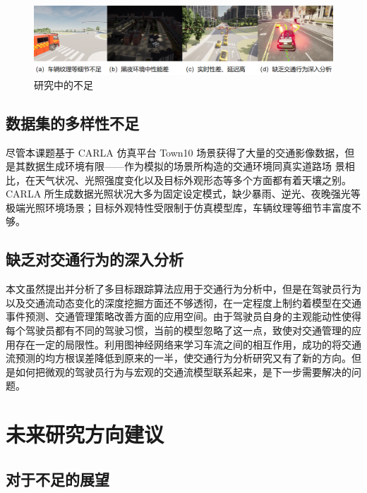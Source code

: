 \begin{figure}[htbp] %
	\centering
	\includegraphics[width=1\textwidth]{p46} %
	\caption{研究中的不足} %
	\label{fig:p46} %
\end{figure}


\subsection{数据集的多样性不足}

尽管本课题基于 CARLA 仿真平台 Town10 场景获得了大量的交通影像数据，但是其数据生成环境有限——作为模拟的场景所构造的交通环境同真实道路场 景相比，在天气状况、光照强度变化以及目标外观形态等多个方面都有着天壤之别。CARLA 所生成数据光照状况大多为固定设定模式，缺少暴雨、逆光、夜晚强光等极端光照环境场景；目标外观特性受限制于仿真模型库，车辆纹理等细节丰富度不够。



\subsection{缺乏对交通行为的深入分析}


本文虽然提出并分析了多目标跟踪算法应用于交通行为分析中，但是在驾驶员行为以及交通流动态变化的深度挖掘方面还不够透彻，在一定程度上制约着模型在交通 事件预测、交通管理策略改善方面的应用空间。由于驾驶员自身的主观能动性使得每个驾驶员都有不同的驾驶习惯，当前的模型忽略了这一点，致使对交通管理的应用存在一定的局限性。利用图神经网络来学习车流之间的相互作用，成功的将交通流预测的均方根误差降低到原来的一半，使交通行为分析研究又有了新的方向。但是如何把微观的驾驶员行为与宏观的交通流模型联系起来，是下一步需要解决的问题。


\section{未来研究方向建议}
\subsection{对于不足的展望}

